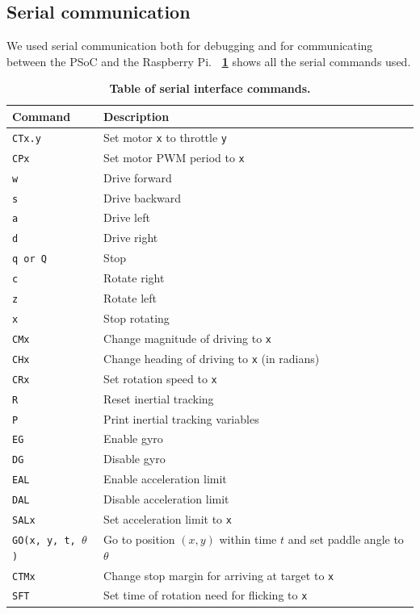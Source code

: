 \documentclass[letterpaper, 11pt]{article}
\newcommand*{\tblref}[1]{\textbf{\tablename~\ref{#1}}}
\begin{document}
\begin{enumerate}[label=\textbf{\arabic*.}]
\subsection{Serial communication}
We used serial communication both for debugging and for communicating between the PSoC and the Raspberry Pi. \tblref{tbl:commands} shows all the serial commands used.
\begin{table}[ht]
    \centering
    \begin{tabular}{@{}ll@{}}
        \toprule
        \textbf{Command} & \textbf{Description} \\ \midrule
        \texttt{CTx.y} & Set motor \texttt{x} to throttle \texttt{y} \\
        \texttt{CPx} & Set motor PWM period to \texttt{x} \\ \midrule
        \texttt{w} & Drive forward \\
        \texttt{s} & Drive backward \\
        \texttt{a} & Drive left \\
        \texttt{d} & Drive right \\
        \texttt{q or Q} & Stop \\
        \texttt{c} & Rotate right \\
        \texttt{z} & Rotate left \\
        \texttt{x} & Stop rotating \\
        \texttt{CMx} & Change magnitude of driving to \texttt{x} \\
        \texttt{CHx} & Change heading of driving to \texttt{x} (in radians) \\
        \texttt{CRx} & Set rotation speed to \texttt{x} \\ \midrule
        \texttt{R} & Reset inertial tracking \\
        \texttt{P} & Print inertial tracking variables \\
        \texttt{EG} & Enable gyro \\
        \texttt{DG} & Disable gyro \\
        \texttt{EAL} & Enable acceleration limit \\ \midrule
        \texttt{DAL} & Disable acceleration limit \\
        \texttt{SALx} & Set acceleration limit to \texttt{x} \\
        \texttt{GO(x, y, t, $\theta$)} & Go to position $(x, y)$ within time $t$ and set paddle angle to $\theta$ \\
        \texttt{CTMx} & Change stop margin for arriving at target to \texttt{x} \\
        \texttt{SFT} & Set time of rotation need for flicking to \texttt{x} \\ \bottomrule
    \end{tabular}
    \caption{\textbf{Table of serial interface commands.}}
    \label{tbl:commands}
\end{table}


\end{enumerate}
\end{document}
